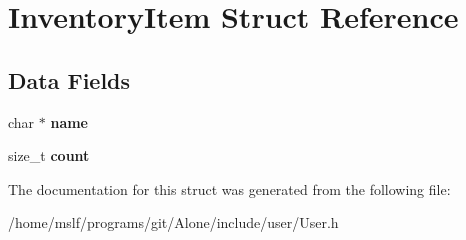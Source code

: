 \hypertarget{struct_inventory_item}{}\section{Inventory\+Item Struct Reference}
\label{struct_inventory_item}
\subsection*{Data Fields}
\begin{DoxyCompactItemize}
\item 
\hypertarget{struct_inventory_item_a5ac083a645d964373f022d03df4849c8}{}\label{struct_inventory_item_a5ac083a645d964373f022d03df4849c8} 
char $\ast$ {\bfseries name}
\item 
\hypertarget{struct_inventory_item_a76d971a3c552bc58ba9f0d5fceae9806}{}\label{struct_inventory_item_a76d971a3c552bc58ba9f0d5fceae9806} 
size\+\_\+t {\bfseries count}
\end{DoxyCompactItemize}


The documentation for this struct was generated from the following file\+:\begin{DoxyCompactItemize}
\item 
/home/mslf/programs/git/\+Alone/include/user/User.\+h\end{DoxyCompactItemize}
